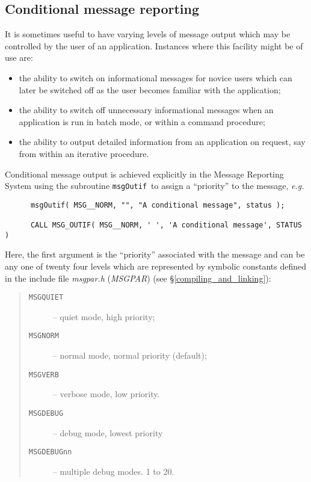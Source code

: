 \documentclass[twoside,11pt]{article}
\newcommand{\htmlref}[2]{#1}
\newcommand{\latex}[1]{#1}
\newcommand{\xlabel}[1]{}
\renewcommand{\_}{\texttt{\symbol{95}}}
\newcommand{\func}[1]{\texttt{#1}}
\newcommand{\const}[1]{\texttt{#1}}
\newcommand{\fname}[1]{\textit{#1}}
\newcommand{\msgnorm}{\const{MSG\_\_NORM}}
\newcommand{\msgverb}{\const{MSG\_\_VERB}}
\newcommand{\msgquiet}{\const{MSG\_\_QUIET}}
\newcommand{\msgdebug}{\const{MSG\_\_DEBUG}}
\newcommand{\msgoutif}{\func{msgOutif}}
\begin{document}
\subsection{\xlabel{conditional_message_reporting}Conditional message reporting}
It is sometimes useful to have varying levels of message output which
may be controlled by the user of an application.
Instances where this facility might be of use are:
\begin {itemize}
\item the ability to switch on informational messages for novice users
which can later be switched off as the user becomes familiar with
the application;
\item the ability to switch off unnecessary informational messages when
an application is run in batch mode, or within a command procedure;
\item the ability to output detailed information from an application on
request, say from within an iterative procedure.
\end {itemize}
Conditional message output is achieved explicitly in the Message Reporting
System using the subroutine \msgoutif\ to assign a ``priority'' to the
message, \textit{e.g.}
\begin {small}
\begin{verbatim}
      msgOutif( MSG__NORM, "", "A conditional message", status );

      CALL MSG_OUTIF( MSG__NORM, ' ', 'A conditional message', STATUS )
\end{verbatim}
\end {small}
Here, the first argument is the ``priority'' associated with the
message and can be any one of twenty four levels which are
represented by symbolic constants defined in the include file
\htmlref
{\fname{msg\_par.h} (\fname{MSG\_PAR})}{compiling_and_linking}\latex{ (see \S\ref{compiling_and_linking})}:
\begin {quote}
\begin {description}
\item [\msgquiet] -- quiet mode, high priority;
\item [\msgnorm] -- normal mode, normal priority (default);
\item [\msgverb] -- verbose mode, low priority.
\item [\msgdebug] -- debug mode, lowest priority
\item [\const{MSG\_\_DEBUGnn}] -- multiple debug modes. 1 to 20.
\end {description}
\end {quote}
\end{document}
